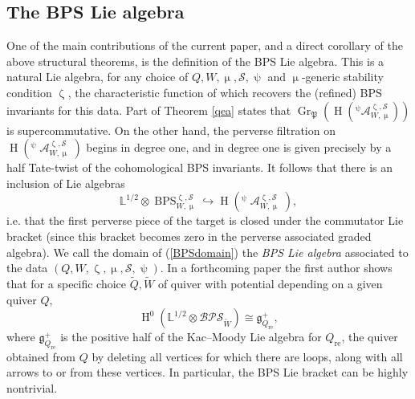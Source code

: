 \documentclass[a4paper,10pt]{amsart}
\renewcommand{\zeta}{\upzeta}
\renewcommand{\psi}{\uppsi}
\renewcommand{\mu}{\upmu}
\DeclareMathOperator{\Pf}{\mathfrak{P}}
\newcommand{\LL}{\mathbb{L}}
\newcommand{\SP}{\mathcal{S}}
\newcommand{\DTS}{\mathcal{BPS}}
\DeclareMathOperator{\Gr}{Gr}
\DeclareMathOperator{\DT}{BPS}
\DeclareMathOperator{\HO}{H}
\DeclareMathOperator{\Coha}{\mathcal{A}}
\begin{document}
\subsection{The BPS Lie algebra}
\label{BPSLA}
One of the main contributions of the current paper, and a direct corollary of the above structural theorems, is the definition of the BPS Lie algebra.  This is a natural Lie algebra, for any choice of $Q,W,\mu,\SP,\psi$ and $\mu$-generic stability condition $\zeta$, the characteristic function of which recovers the (refined) BPS invariants for this data.  Part of Theorem \ref{qea} states that $\Gr_{\Pf}(\HO(^{\psi}\!\!\mathcal{A}_{W,\mu}^{\zeta,\SP}))$ is supercommutative.  On the other hand, the perverse filtration on $\HO(^{\psi}\!\!\Coha_{W,\mu}^{\zeta,\SP})$ begins in degree one, and in degree one is given precisely by a half Tate-twist of the cohomological BPS invariants.  It follows that there is an inclusion of Lie algebras
\begin{equation}
\label{BPSdomain}
\LL^{1/2}\otimes\DT_{W,\mu}^{\zeta,\SP}\hookrightarrow \HO(^{\psi}\!\!\Coha_{W,\mu}^{\zeta,\SP}),
\end{equation}
i.e. that the first perverse piece of the target is closed under the commutator Lie bracket (since this bracket becomes zero in the perverse associated graded algebra).  We call the domain of (\ref{BPSdomain}) the \textit{BPS Lie algebra} associated to the data $(Q,W,\zeta,\mu,\SP,\psi)$.  In a forthcoming paper the first author shows that for a specific choice $\tilde{Q},\tilde{W}$ of quiver with potential depending on a given quiver $Q$,
\[
\HO^0(\LL^{1/2}\otimes \DTS_{\tilde{W}})\cong\mathfrak{g}_{Q_{\mathrm{re}}}^+,
\]
where $\mathfrak{g}_{Q_{\mathrm{re}}}^+$ is the positive half of the Kac--Moody Lie algebra for $Q_{\mathrm{re}}$, the quiver obtained from $Q$ by deleting all vertices for which there are loops, along with all arrows to or from these vertices.  In particular, the BPS Lie bracket can be highly nontrivial.
\end{document}

